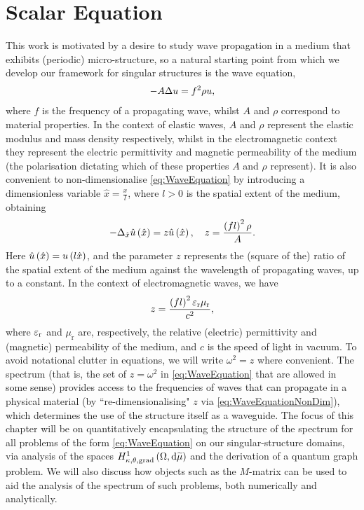 \chapter{Scalar Equation}

This work is motivated by a desire to study wave propagation in a medium that exhibits (periodic) micro-structure, so a natural starting point from which we develop our framework for singular structures is the wave equation,
\begin{align} \label{eq:WaveEquation}
	- A \Delta u = f^2 \rho u,
\end{align}
where $f$ is the frequency of a propagating wave, whilst $A$ and $\rho$ correspond to material properties.
In the context of elastic waves, $A$ and $\rho$ represent the elastic modulus and mass density respectively, whilst in the electromagnetic context they represent the electric permittivity and magnetic permeability of the medium (the polarisation dictating which of these properties $A$ and $\rho$ represent).
It is also convenient to non-dimensionalise \eqref{eq:WaveEquation} by introducing a dimensionless variable $\hat{x} = \frac{x}{l}$, where $l>0$ is the spatial extent of the medium, obtaining
\begin{align} \label{eq:WaveEquationNonDim}
	- \Delta_{\hat{x}}\hat{u}\left( \hat{x} \right) = z \hat{u}\left( \hat{x} \right),
	\quad
	z = \frac{\left( fl \right)^2\rho}{A}.
\end{align} 
Here $\hat{u}\left( \hat{x} \right) = u\left( l\hat{x} \right)$, and the parameter $z$ represents the (square of the) ratio of the spatial extent of the medium against the wavelength of propagating waves, up to a constant.
In the context of electromagnetic waves, we have
\begin{align*}
	z = \frac{\left( fl \right)^2\varepsilon_{\mathrm{r}}\mu_{\mathrm{r}}}{c^2},
\end{align*}
where $\varepsilon_{\mathrm{r}}$ and $\mu_{\mathrm{r}}$ are, respectively, the relative (electric) permittivity and (magnetic) permeability of the medium, and $c$ is the speed of light in vacuum. 
To avoid notational clutter in equations, we will write $\omega^2=z$ where convenient.
The spectrum (that is, the set of $z=\omega^2$ in \eqref{eq:WaveEquation} that are allowed in some sense)  provides access to the frequencies of waves that can propagate in a physical material (by ``re-dimensionalising" $z$ via \eqref{eq:WaveEquationNonDim}), which determines the use of the structure itself as a waveguide.
The focus of this chapter will be on quantitatively encapsulating the structure of the spectrum for all problems of the form \eqref{eq:WaveEquation} on our singular-structure domains, via analysis of the spaces $H^1_{\kappa,\theta,\mathrm{grad}}\left( \Omega, \mathrm{d}\widetilde{\mu} \right)$ and the derivation of a quantum graph problem.
We will also discuss how objects such as the $M$-matrix  can be used to aid the analysis of the spectrum of such problems, both numerically and analytically.

